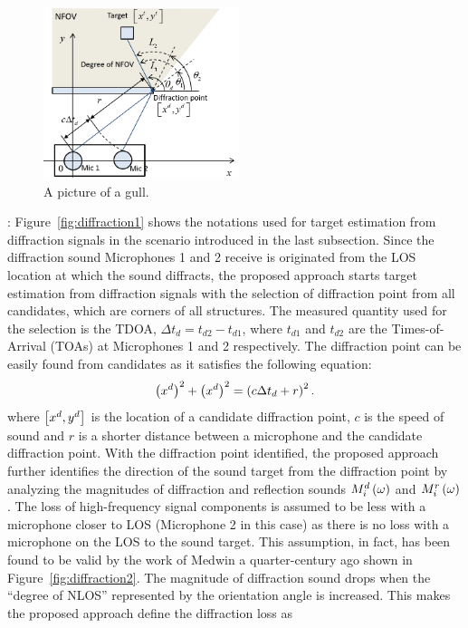 \documentclass[letterpaper, 10 pt, conference]{ieeeconf}  %
\begin{document}
\begin{figure}[h!]
  \caption{A picture of a gull.}
  \centering
		\includegraphics[height=50mm]{Figures/diffraction1}
\end{figure}
: Figure~\ref{fig:diffraction1} shows the notations used for target estimation from diffraction signals in the scenario introduced in the last subsection.  Since the diffraction sound Microphones 1 and 2 receive is originated from the LOS location at which the sound diffracts, the proposed approach starts target estimation from diffraction signals with the selection of diffraction point from all candidates, which are corners of all structures.  The measured quantity used for the selection is the TDOA, $\Delta t_d = t_{d2} - t_{d1}$, where $t_{d1}$ and $t_{d2}$ are the Times-of-Arrival (TOAs) at Microphones 1 and 2 respectively.  The diffraction point can be easily found from candidates as it satisfies the following equation:  
\begin{equation}\label{eq:TDOA1}
\left ( x^d \right )^2 + \left ( x^d \right )^2 = \left ( c \Delta t_d + r \right )^2.  
\end{equation}
where $\left [ x^d, y^d \right ]$ is the location of a candidate diffraction point, $c$ is the speed of sound and $r$ is a shorter distance between a microphone and the candidate diffraction point.  
With the diffraction point identified, the proposed approach further identifies the direction of the sound target from the diffraction point by analyzing the magnitudes of diffraction and reflection sounds $M_i^d\left ( \omega \right )$ and $M_i^r\left ( \omega \right )$.  The loss of high-frequency signal components is assumed to be less with a microphone closer to LOS (Microphone 2 in this case) as there is no loss with a microphone on the LOS to the sound target.  This assumption, in fact, has been found to be valid by the work of Medwin a quarter-century ago \cite{medwin1981shadowing} shown in Figure~\ref{fig:diffraction2}.  The magnitude of diffraction sound drops when the ``degree of NLOS'' represented by the orientation angle is increased.   This makes the proposed approach define the diffraction loss as
\end{document}

